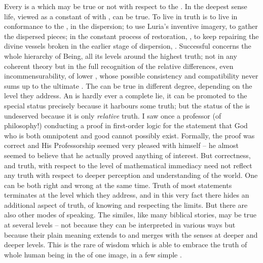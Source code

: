 \pa Every  is a  which may be true or not with respect to
the .  In the deepest sense life, viewed as a constant
 of  with , can be true.  To live
in truth is to live in conformance to the , in the  dispersion; to use Luria's inventive imagery, to gather the dispersed
pieces; in the constant process of restoration, , to keep
repairing the divine vessels broken in the 
earlier stage of dispersion, .
Successful 
 concerns the whole hierarchy of Being,  all its levels
around the highest truth; not in any coherent theory but in the
full recognition of the relative differences, even incommensurability, of lower
, whose possible consistency and compatibility never sums up to
the ultimate . The  can be true in
different degree, depending on the level they address. An  is
hardly ever a complete lie, it can be promoted to the special status precisely
because it harbours some truth; but the status of the  is
undeserved because it is only {\em relative} truth. I saw once a professor (of
philosophy!) conducting a proof in first-order logic for the statement that God
who is both omnipotent and good cannot possibly exist.  Formally, the proof was
correct and His Professorship seemed very pleased with himself -- he almost seemed
to believe that he actually proved anything of interest. But correctness, and
truth, with respect to the level of mathematical immediacy need not reflect any
truth with respect to deeper perception and understanding of the world. One can
be both right and wrong at the same time.
Truth of most statements terminates at the level which they address, and
in this very fact  there hides an additional aspect of truth,
of knowing and respecting the limits. But there are also other modes of speaking. The
similes, like many biblical stories, may be true at several levels -- not
because they can be interpreted in various ways but because their plain meaning
extends to and merges with the senses at deeper and deeper levels. This is the
rare  of wisdom which is able to embrace the truth of whole human being in the
 of one image, in a few simple .


